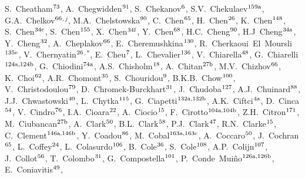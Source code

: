 \begin{flushleft}
S.~Cheatham$^\textrm{\scriptsize 73}$,
A.~Chegwidden$^\textrm{\scriptsize 91}$,
S.~Chekanov$^\textrm{\scriptsize 6}$,
S.V.~Chekulaev$^\textrm{\scriptsize 159a}$,
G.A.~Chelkov$^\textrm{\scriptsize 66}$$^{,j}$,
M.A.~Chelstowska$^\textrm{\scriptsize 90}$,
C.~Chen$^\textrm{\scriptsize 65}$,
H.~Chen$^\textrm{\scriptsize 26}$,
K.~Chen$^\textrm{\scriptsize 148}$,
S.~Chen$^\textrm{\scriptsize 34c}$,
S.~Chen$^\textrm{\scriptsize 155}$,
X.~Chen$^\textrm{\scriptsize 34f}$,
Y.~Chen$^\textrm{\scriptsize 68}$,
H.C.~Cheng$^\textrm{\scriptsize 90}$,
H.J~Cheng$^\textrm{\scriptsize 34a}$,
Y.~Cheng$^\textrm{\scriptsize 32}$,
A.~Cheplakov$^\textrm{\scriptsize 66}$,
E.~Cheremushkina$^\textrm{\scriptsize 130}$,
R.~Cherkaoui~El~Moursli$^\textrm{\scriptsize 135e}$,
V.~Chernyatin$^\textrm{\scriptsize 26}$$^{,*}$,
E.~Cheu$^\textrm{\scriptsize 7}$,
L.~Chevalier$^\textrm{\scriptsize 136}$,
V.~Chiarella$^\textrm{\scriptsize 48}$,
G.~Chiarelli$^\textrm{\scriptsize 124a,124b}$,
G.~Chiodini$^\textrm{\scriptsize 74a}$,
A.S.~Chisholm$^\textrm{\scriptsize 18}$,
A.~Chitan$^\textrm{\scriptsize 27b}$,
M.V.~Chizhov$^\textrm{\scriptsize 66}$,
K.~Choi$^\textrm{\scriptsize 62}$,
A.R.~Chomont$^\textrm{\scriptsize 35}$,
S.~Chouridou$^\textrm{\scriptsize 9}$,
B.K.B.~Chow$^\textrm{\scriptsize 100}$,
V.~Christodoulou$^\textrm{\scriptsize 79}$,
D.~Chromek-Burckhart$^\textrm{\scriptsize 31}$,
J.~Chudoba$^\textrm{\scriptsize 127}$,
A.J.~Chuinard$^\textrm{\scriptsize 88}$,
J.J.~Chwastowski$^\textrm{\scriptsize 40}$,
L.~Chytka$^\textrm{\scriptsize 115}$,
G.~Ciapetti$^\textrm{\scriptsize 132a,132b}$,
A.K.~Ciftci$^\textrm{\scriptsize 4a}$,
D.~Cinca$^\textrm{\scriptsize 54}$,
V.~Cindro$^\textrm{\scriptsize 76}$,
I.A.~Cioara$^\textrm{\scriptsize 22}$,
A.~Ciocio$^\textrm{\scriptsize 15}$,
F.~Cirotto$^\textrm{\scriptsize 104a,104b}$,
Z.H.~Citron$^\textrm{\scriptsize 171}$,
M.~Ciubancan$^\textrm{\scriptsize 27b}$,
A.~Clark$^\textrm{\scriptsize 50}$,
B.L.~Clark$^\textrm{\scriptsize 58}$,
P.J.~Clark$^\textrm{\scriptsize 47}$,
R.N.~Clarke$^\textrm{\scriptsize 15}$,
C.~Clement$^\textrm{\scriptsize 146a,146b}$,
Y.~Coadou$^\textrm{\scriptsize 86}$,
M.~Cobal$^\textrm{\scriptsize 163a,163c}$,
A.~Coccaro$^\textrm{\scriptsize 50}$,
J.~Cochran$^\textrm{\scriptsize 65}$,
L.~Coffey$^\textrm{\scriptsize 24}$,
L.~Colasurdo$^\textrm{\scriptsize 106}$,
B.~Cole$^\textrm{\scriptsize 36}$,
S.~Cole$^\textrm{\scriptsize 108}$,
A.P.~Colijn$^\textrm{\scriptsize 107}$,
J.~Collot$^\textrm{\scriptsize 56}$,
T.~Colombo$^\textrm{\scriptsize 31}$,
G.~Compostella$^\textrm{\scriptsize 101}$,
P.~Conde~Mui\~no$^\textrm{\scriptsize 126a,126b}$,
E.~Coniavitis$^\textrm{\scriptsize 49}$,

\end{flushleft}
